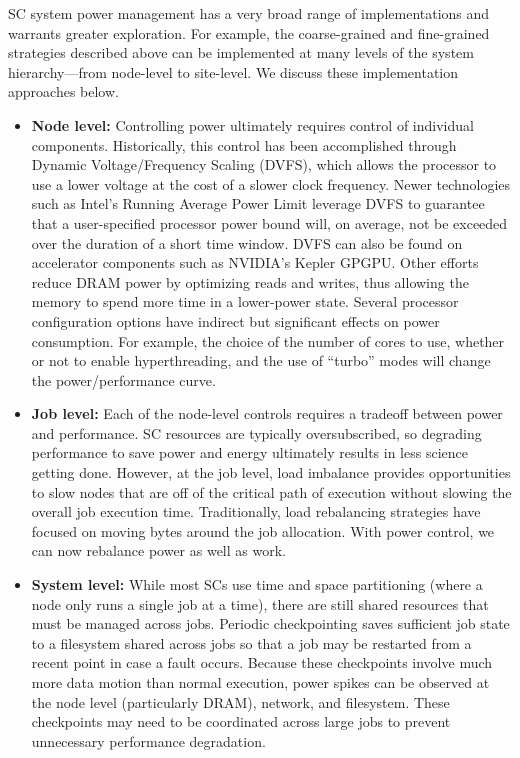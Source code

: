 SC system power management has a very broad range of implementations and warrants greater exploration. For example, the coarse-grained and fine-grained strategies described above can be implemented at many levels of the system hierarchy---from node-level to site-level. We discuss these implementation approaches below.  

\begin{itemize}
\item \textbf{Node level:} Controlling power ultimately requires control of individual
components. Historically, this control has been accomplished through Dynamic Voltage/Frequency Scaling (DVFS), which allows the processor to use a lower voltage at the cost of a slower clock frequency. Newer technologies such as Intel's Running Average Power Limit leverage DVFS to guarantee that a user-specified processor power bound will, on average, not be exceeded over the duration of a short time window. DVFS can also be found on accelerator components such as NVIDIA's Kepler GPGPU. Other efforts reduce DRAM power by optimizing reads and writes, thus allowing the memory to spend more time in a lower-power state. Several processor configuration options have indirect but significant effects on power consumption. For example, the choice of the number of cores to use, whether or not to enable hyperthreading, and the use of ``turbo'' modes will change the power/performance curve.

\item \textbf{Job level:} Each of the node-level controls requires a tradeoff between
power and performance. SC resources are typically oversubscribed, so degrading performance
to save power and energy ultimately results in less science getting done. However, at the 
job level, load imbalance provides opportunities to slow nodes that are off of the critical
path of execution without slowing the overall job execution time. Traditionally, load 
rebalancing strategies have focused on moving bytes around the job allocation. With 
power control, we can now rebalance power as well as work.

\item \textbf{System level:} While most SCs use time and space partitioning (where a node
only runs a single job at a time), there are still shared resources that must be managed
across jobs. Periodic checkpointing saves sufficient job state to a filesystem shared 
across jobs so that a job may be restarted from a recent point in case a fault occurs.
Because these checkpoints involve much more data motion than normal execution, power 
spikes can be observed at the node level (particularly DRAM), network, and filesystem.
These checkpoints may need to be coordinated across large jobs to prevent unnecessary
performance degradation.


\end{itemize}
